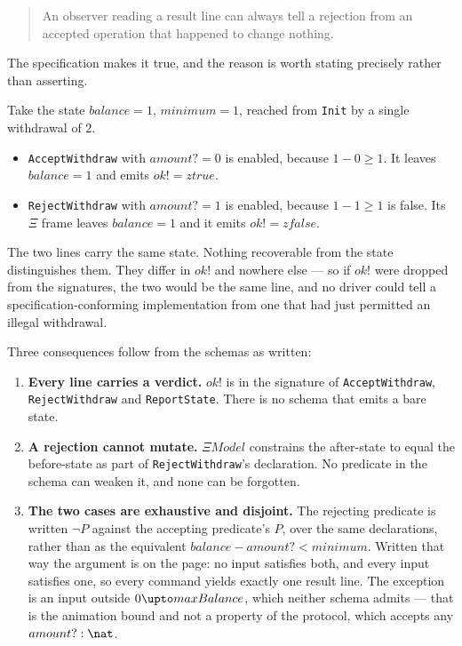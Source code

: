 \documentclass[a4paper,10pt,fleqn]{article}
\begin{document}
\begin{quote}
  An observer reading a result line can always tell a rejection from an
  accepted operation that happened to change nothing.
\end{quote}

The specification makes it true, and the reason is worth stating
precisely rather than asserting.

Take the state $balance = 1$, $minimum = 1$, reached from \texttt{Init}
by a single withdrawal of $2$.

\begin{itemize}
  \item \texttt{AcceptWithdraw} with $amount? = 0$ is enabled, because
    $1 - 0 \geq 1$. It leaves $balance = 1$ and emits $ok! = ztrue$.
  \item \texttt{RejectWithdraw} with $amount? = 1$ is enabled, because
    $1 - 1 \geq 1$ is false. Its $\Xi$ frame leaves $balance = 1$ and it
    emits $ok! = zfalse$.
\end{itemize}

The two lines carry the same state. Nothing recoverable from the state
distinguishes them. They differ in $ok!$ and nowhere else --- so if $ok!$
were dropped from the signatures, the two would be the same line, and no
driver could tell a specification-conforming implementation from one that
had just permitted an illegal withdrawal.

Three consequences follow from the schemas as written:

\begin{enumerate}
  \item \textbf{Every line carries a verdict.} $ok!$ is in the signature
    of \texttt{AcceptWithdraw}, \texttt{RejectWithdraw} and
    \texttt{ReportState}. There is no schema that emits a bare state.
  \item \textbf{A rejection cannot mutate.} $\Xi Model$ constrains the
    after-state to equal the before-state as part of
    \texttt{RejectWithdraw}'s declaration. No predicate in the schema can
    weaken it, and none can be forgotten.
  \item \textbf{The two cases are exhaustive and disjoint.} The
    rejecting predicate is written $\lnot P$ against the accepting
    predicate's $P$, over the same declarations, rather than as the
    equivalent $balance - amount? < minimum$. Written that way the
    argument is on the page: no input satisfies both, and every input
    satisfies one, so every command yields exactly one result line. The
    exception is an input outside $0 \upto maxBalance$, which neither
    schema admits --- that is the animation bound and not a property of
    the protocol, which accepts any $amount? : \nat$.
\end{enumerate}
\end{document}
